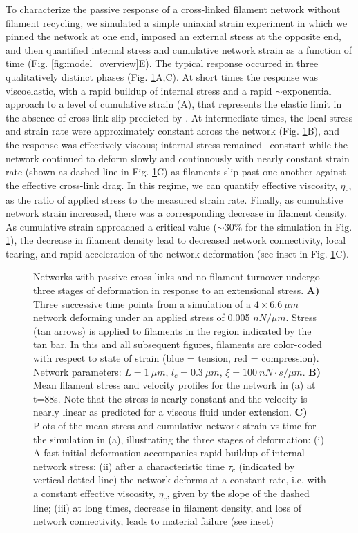 \documentclass[10pt,letterpaper]{article}
\begin{document}
To characterize the passive response of a cross-linked filament network without filament recycling, we simulated a simple uniaxial strain experiment in which we pinned the network at one end, imposed an external stress at the opposite end, and then quantified internal stress and cumulative network strain as a function of time (Fig. \ref{fig:model_overview}E). The typical response occurred in three qualitatively distinct phases (Fig. \ref{fig:passive_ex}A,C). At short times the response was viscoelastic, with a rapid buildup of internal stress and a rapid $\sim$exponential approach to a level of cumulative strain (A), that represents the elastic limit in the absence of cross-link slip predicted by \cite{theo_hlm}. At intermediate times, the local stress and strain rate were approximately constant across the network (Fig. \ref{fig:passive_ex}B), and the response was effectively viscous; internal stress remained ~constant while the network continued to deform slowly and continuously with nearly constant strain rate (shown as dashed line in Fig. \ref{fig:passive_ex}C) as filaments slip past one another against the effective cross-link drag. In this regime, we can quantify effective viscosity, $\eta_c$,  as the ratio of applied stress to the measured strain rate. Finally, as cumulative network strain increased, there was a corresponding decrease in filament density. As cumulative strain approached a critical value ($\sim 30\%$ for the simulation in Fig. \ref{fig:passive_ex}), the decrease in filament density lead to decreased network connectivity, local tearing, and rapid acceleration of the network deformation (see inset in Fig. \ref{fig:passive_ex}C).


\begin{figure}[h!]
\centering
\caption{\label{fig:passive_ex}  Networks with passive cross-links and no filament turnover undergo three stages of deformation in response to an extensional stress.   \textbf{A)} Three successive time points from a simulation of a $4\times6.6\: \mu m$ network deforming under an applied stress of 0.005 $nN/\mu m$. Stress (tan arrows) is applied to filaments in the region indicated by the tan bar. In this and all subsequent figures, filaments are color-coded with respect to state of strain (blue = tension, red = compression).  Network parameters: $L=1\: \mu m$, $l_c=0.3\: \mu m$, $\xi=100\: nN\cdot s/\mu m$. \textbf{B)} Mean filament stress and velocity profiles for the  network in (a) at t=88s. Note that the stress is nearly constant and the velocity is nearly linear as predicted for a viscous fluid under extension.  \textbf{C)} Plots of the mean stress and cumulative network strain vs time for the simulation in (a), illustrating the three stages of deformation: (i) A fast initial deformation accompanies rapid buildup of internal network stress; (ii) after a characteristic time $\tau_c$ (indicated by vertical dotted line) the network deforms at a constant rate, i.e. with a constant effective viscosity, $\eta_c$, given by the slope of the dashed line; (iii) at long times, decrease in filament density, and loss of network connectivity, leads to material failure (see inset)}
\end{figure}
\end{document}
